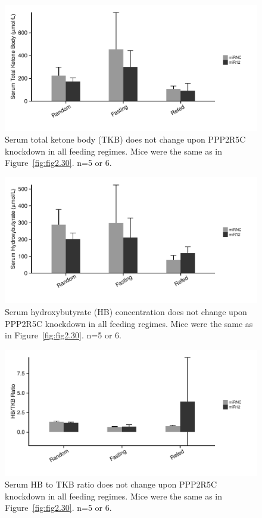 \begin{figure}[htbp]
\centering
\includegraphics[width=1\textwidth]{figs/fig2-37 serum TKB.pdf}
\caption[Serum total ketone body upon PPP2R5C KD]{\footnotesize Serum total ketone body (TKB) does not change upon PPP2R5C knockdown in all feeding regimes. Mice were the same as in Figure~\ref{fig:fig2.30}. n=5 or 6.}
\label{fig:fig2.37}
\end{figure}

\begin{figure}[htbp]
\centering
\includegraphics[width=1\textwidth]{figs/fig2-38 serum HB.pdf}
\caption[Serum hydroxybutyrate upon PPP2R5C KD]{\footnotesize Serum hydroxybutyrate (HB) concentration does not change upon PPP2R5C knockdown in all feeding regimes. Mice were the same as in Figure~\ref{fig:fig2.30}. n=5 or 6.}
\label{fig:fig2.38}
\end{figure}

\begin{figure}[htbp]
\centering
\includegraphics[width=1\textwidth]{figs/fig2-39 serum KB ratio.pdf}
\caption[Serum HB to TKB ratio upon PPP2R5C KD]{\footnotesize Serum HB to TKB ratio does not change upon PPP2R5C knockdown in all feeding regimes. Mice were the same as in Figure~\ref{fig:fig2.30}. n=5 or 6.}
\label{fig:fig2.39}
\end{figure}

